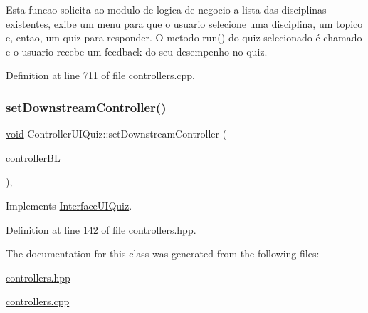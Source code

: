 Esta funcao solicita ao modulo de logica de negocio a lista das disciplinas existentes, exibe um menu para que o usuario selecione uma disciplina, um topico e, entao, um quiz para responder. O metodo run() do quiz selecionado é chamado e o usuario recebe um feedback do seu desempenho no quiz. 

Definition at line 711 of file controllers.\+cpp.

\mbox{\label{class_controller_u_i_quiz_a17083c1071e7bee3a1d4c0515d433907}} 
\subsubsection{\texorpdfstring{set\+Downstream\+Controller()}{setDownstreamController()}}
{\footnotesize\ttfamily \hyperlink{class_interface_u_i_quiz_a8a3301246ca34b00553527afef00eb23}{void} Controller\+U\+I\+Quiz\+::set\+Downstream\+Controller (\begin{DoxyParamCaption}\item[{\hyperlink{class_interface_b_l_quiz}{Interface\+B\+L\+Quiz} $\ast$}]{controller\+BL }\end{DoxyParamCaption})\hspace{0.3cm}{\ttfamily [inline]}, {\ttfamily [virtual]}}



Implements \hyperlink{class_interface_u_i_quiz_a599dff405ea117a75c7084c2dd08ee28}{Interface\+U\+I\+Quiz}.



Definition at line 142 of file controllers.\+hpp.



The documentation for this class was generated from the following files\+:\begin{DoxyCompactItemize}
\item 
\hyperlink{controllers_8hpp}{controllers.\+hpp}\item 
\hyperlink{controllers_8cpp}{controllers.\+cpp}\end{DoxyCompactItemize}
